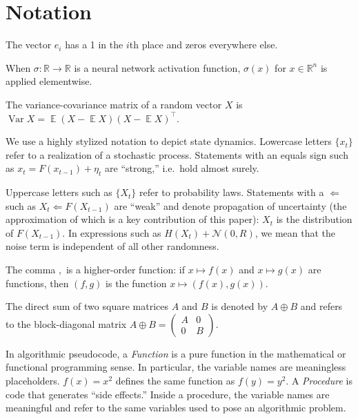 \documentclass[oneside, article]{memoir}
\DeclareMathOperator{\expect}{\mathbb{E}}
\DeclareMathOperator{\Var}{\operatorname{Var}}
\begin{document}

\chapter{Notation}
The vector \(e_i\) has a 1 in the \(i\)th place and zeros everywhere else.

When \(\sigma:\mathbb R \to \mathbb R\) is a neural network activation function, \(\sigma (x)\) for \(x \in \mathbb{R}^n\) is applied elementwise.

The variance-covariance matrix of a random vector \(X\) is \(\Var X = \expect(X - \expect X)(X - \expect X)^\intercal\).

We use a highly stylized notation to depict state dynamics.
Lowercase letters \(\{x_t\}\) refer to a realization of a stochastic process.
Statements with an equals sign such as \(x_{t} = F(x_{t-1}) +
\eta_t\) are ``strong,'' i.e.~hold almost surely.

Uppercase letters such as \(\{X_t\}\) refer to probability laws.
Statements with a \(\Longleftarrow\) such as \(X_t \Longleftarrow
F(X_{t-1})\) are ``weak'' and denote propagation of uncertainty (the
approximation of which is a key contribution of this paper): \(X_t\)
is the distribution of \(F(X_{t-1})\).
In expressions such as \(H(X_t) + \mathcal N(0, R)\), we mean that
the noise term is independent of all other randomness.

The comma \(,\) is a higher-order function:
if \(x \mapsto f(x)\) and \(x \mapsto g(x)\) are functions, then \((f
, g)\) is the function \(x \mapsto (f(x), g(x))\).

The direct sum of two square matrices \(A\) and \(B\) is denoted by
\(A \oplus B\) and refers to the block-diagonal matrix \(A \oplus B =
  \begin{pmatrix} A & 0 \\ 0 & B
\end{pmatrix}\).

In algorithmic pseudocode, a \emph{Function} is a pure function in
the mathematical or functional
programming sense.
In particular, the variable names are meaningless placeholders.
\(f(x) = x^2\) defines the same function as \(f(y) = y^2\).
A \emph{Procedure} is code that generates ``side effects.''
Inside a procedure, the variable names are meaningful and refer to
the same variables used to pose an algorithmic problem.
\end{document}
